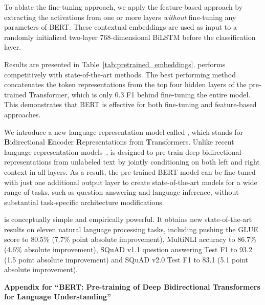 To ablate the fine-tuning approach, we apply the feature-based approach by extracting the activations from one or more layers {\it without} fine-tuning any parameters of BERT. These contextual embeddings are used as input to a randomly initialized two-layer 768-dimensional BiLSTM before the classification layer.

Results are presented in Table~\ref{tab:pretrained_embeddings}. \bertlarge performs competitively with state-of-the-art methods. The best performing method concatenates the token representations from the top four hidden layers of the pre-trained Transformer, which is only 0.3 F1 behind fine-tuning the entire model. This demonstrates that BERT is effective for both fine-tuning and feature-based approaches.





We introduce a new language representation model called {\bf \bert}, which stands for \textbf{B}idirectional \textbf{E}ncoder \textbf{R}epresentations from \textbf{T}ransformers. Unlike recent language representation models~\cite{peters-etal:2018:_deep, radford-etal:2018},  \bert is designed to pre-train deep bidirectional representations from unlabeled text by jointly conditioning on both left and right context in all layers. As a result, the pre-trained BERT model can be fine-tuned with just one additional output layer to create state-of-the-art models for a wide range of tasks, such as question answering and language inference, without substantial task-specific architecture modifications. 

\bert is conceptually simple and empirically powerful. It obtains new state-of-the-art results on eleven natural language processing tasks, including pushing the GLUE score to 80.5\% (7.7\% point absolute improvement), MultiNLI accuracy to 86.7\% (4.6\% absolute improvement), SQuAD v1.1 question answering Test F1 to 93.2 (1.5 point absolute improvement) and SQuAD v2.0 Test F1 to 83.1 (5.1 point absolute improvement).




\begin{center}
{\bf \large{
    Appendix for ``BERT: Pre-training of Deep Bidirectional Transformers for Language Understanding''}}
\end{center}


